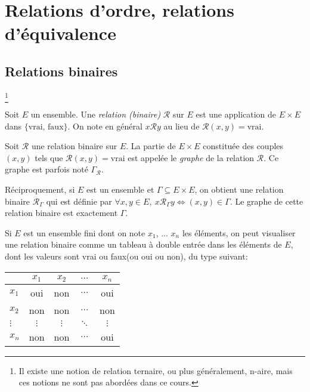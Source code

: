 
\chapter{Relations d'ordre, relations d'équivalence}
\minitoc
\hyperlink{toc}{\retourTOC}


\section{Relations binaires}\footnote{Il existe une notion de relation ternaire, ou plus généralement, n-aire, mais ces notions ne sont pas abordées dans ce cours.}


\begin{definition}
Soit $E$ un ensemble. Une \emph{relation (binaire)} ${\mathcal R}$ sur $E$ est une application de $E\times E$ dans $\{\text{vrai, faux}\}$. On note en général \og$x{\mathcal R}y$\fg{} au lieu de \og${\mathcal R}(x,y)=\text{vrai}$\fg{}.
\end{definition}

\begin{definition}
Soit $\mathcal R$ une relation binaire sur $E$. La partie de $E\times E$ constituée des couples $(x,y)$ tels que ${\mathcal R}(x,y)=\text{vrai}$ est appelée le \emph{graphe} de la relation $\mathcal R$. Ce graphe est parfois noté $\Gamma_{\mathcal R}$.

Réciproquement, si $E$ est un ensemble et $\Gamma \subseteq E\times E$, on obtient une relation binaire ${\mathcal R}_\Gamma$ qui est définie par $\forall x, y\in E, \: x{\mathcal R}_\Gamma y \iff (x,y)\in \Gamma$. Le graphe de cette relation binaire est exactement $\Gamma$.
\end{definition}






Si $E$ est un ensemble fini dont on note $x_1$, ... $x_n$ les éléments, on peut visualiser une relation binaire comme un tableau à double entrée dans les éléments de $E$, dont les valeurs sont \og vrai\fg{} ou \og faux\fg (ou \og oui\fg{} ou \og non\fg), du type suivant:

\begin{center}
\begin{tabular}{|l|c|c|c|c|}\hline
		& $x_1$ & $x_2$ & $\dots$ & $x_n$ \\ \hline
$x_1$ 	& oui & non & $\dots$ & oui \\ \hline
$x_2$ 	& non & non & $\dots$ & non \\ \hline
$\vdots$& $\vdots$ & $\vdots$ &  $\ddots$ & $\vdots$ \\ \hline
$x_n$	& non & non & $\dots$ & oui \\ \hline
\end{tabular}
\end{center}

